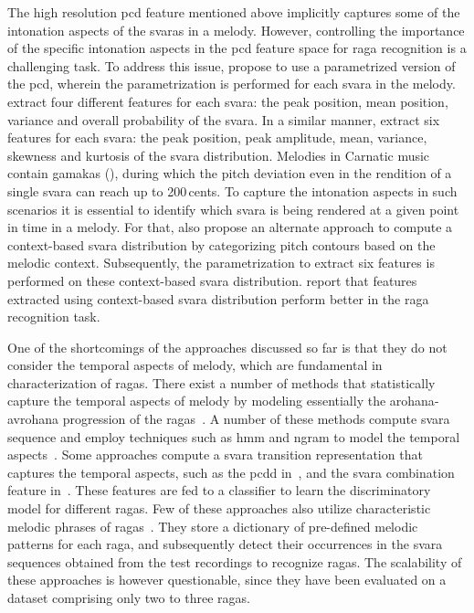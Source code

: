 The high resolution \gls{pcd} feature mentioned above implicitly captures some of the intonation aspects of the \glspl{svara} in a melody. However, controlling the importance of the specific intonation aspects in the \gls{pcd} feature space for \gls{raga} recognition is a challenging task. To address this issue, \cite{belle2009raga,koduri2014intonation} propose to use a parametrized version of the \gls{pcd}, wherein the parametrization is performed for each \gls{svara} in the melody. \cite{belle2009raga} extract four different features for each \gls{svara}: the peak position, mean position, variance and overall probability of the \gls{svara}. In a similar manner, \cite{koduri2014intonation} extract six features for each \gls{svara}: the peak position, peak amplitude, mean, variance, skewness and kurtosis of the \gls{svara} distribution. Melodies in Carnatic music contain \glspl{gamaka} (), during which the pitch deviation even in the rendition of a single \gls{svara} can reach up to 200\,cents. To capture the intonation aspects in such scenarios it is essential to identify which \gls{svara} is being rendered at a given point in time in a melody. For that, \cite{koduri2014intonation} also propose an alternate approach to compute a context-based \gls{svara} distribution by categorizing pitch contours based on the melodic context. Subsequently, the parametrization to extract six features is performed on these context-based \gls{svara} distribution. \cite{koduri2014intonation} report that features extracted using context-based \gls{svara} distribution perform better in the \gls{raga} recognition task.

One of the shortcomings of the approaches discussed so far is that they do not consider the temporal aspects of melody, which are fundamental in characterization of \glspl{raga}. There exist a number of methods that statistically capture the temporal aspects of melody by modeling essentially the \gls{arohana}-\gls{avrohana} progression of the \glspl{raga}~\citep{pandey2003tansen,chordia2007raag,Shetty2009,sridhar2009raga,dighe2013scale,kumar2014identifying}. A number of these methods compute \gls{svara} sequence and employ techniques such as \gls{hmm} and \acrshort{ngram} to model the temporal aspects~\citep{pandey2003tansen,dighe2013scale,kumar2014identifying}. Some approaches compute a \gls{svara} transition representation that captures the temporal aspects, such as the \gls{pcdd} in~\cite{chordia2007raag}, and the \gls{svara} combination feature in~\cite{Shetty2009}. These features are fed to a classifier to learn the discriminatory model for different \glspl{raga}. Few of these approaches also utilize characteristic melodic phrases of \glspl{raga}~\citep{pandey2003tansen,sridhar2009raga}. They store a dictionary of pre-defined melodic patterns for each \gls{raga}, and subsequently detect their occurrences in the \gls{svara} sequences obtained from the test recordings to recognize \glspl{raga}. The scalability of these approaches is however questionable, since they have been evaluated on a dataset comprising only two to three \glspl{raga}. 

